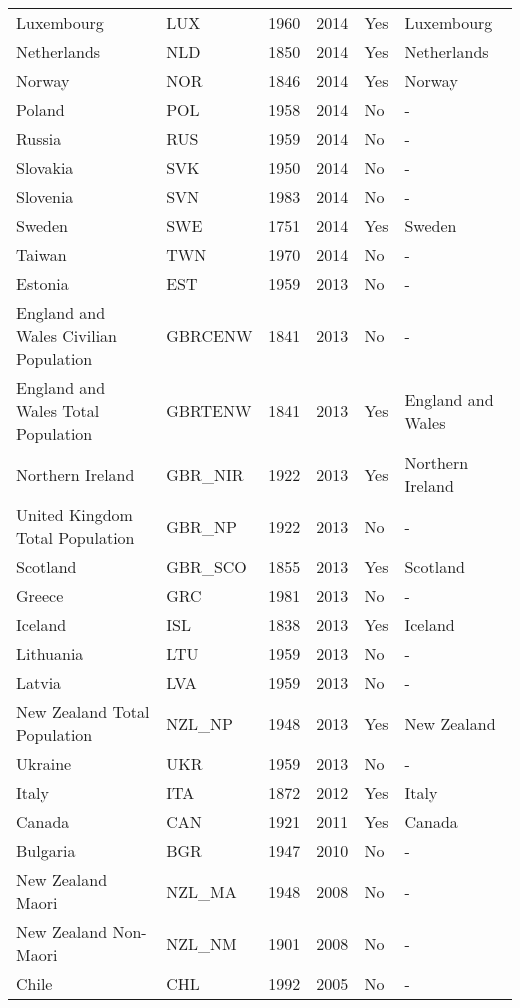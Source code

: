 \documentclass{article}\usepackage[]{graphicx}\usepackage[]{color}
\begin{document}
\begin{table}[ht]
\begin{tabular}{llrrll}
  Luxembourg & LUX & 1960 & 2014 & Yes & Luxembourg \\ 
  Netherlands & NLD & 1850 & 2014 & Yes & Netherlands \\ 
  Norway & NOR & 1846 & 2014 & Yes & Norway \\ 
  Poland & POL & 1958 & 2014 & No & - \\ 
  Russia & RUS & 1959 & 2014 & No & - \\ 
  Slovakia & SVK & 1950 & 2014 & No & - \\ 
  Slovenia & SVN & 1983 & 2014 & No & - \\ 
  Sweden & SWE & 1751 & 2014 & Yes & Sweden \\ 
  Taiwan & TWN & 1970 & 2014 & No & - \\ 
  Estonia & EST & 1959 & 2013 & No & - \\ 
  England and Wales Civilian Population & GBRCENW & 1841 & 2013 & No & - \\ 
  England and Wales Total Population & GBRTENW & 1841 & 2013 & Yes & England and Wales \\ 
  Northern Ireland & GBR\_NIR & 1922 & 2013 & Yes & Northern Ireland \\ 
  United Kingdom Total Population & GBR\_NP & 1922 & 2013 & No & - \\ 
  Scotland & GBR\_SCO & 1855 & 2013 & Yes & Scotland \\ 
  Greece & GRC & 1981 & 2013 & No & - \\ 
  Iceland & ISL & 1838 & 2013 & Yes & Iceland \\ 
  Lithuania & LTU & 1959 & 2013 & No & - \\ 
  Latvia & LVA & 1959 & 2013 & No & - \\ 
  New Zealand Total Population & NZL\_NP & 1948 & 2013 & Yes & New Zealand \\ 
  Ukraine & UKR & 1959 & 2013 & No & - \\ 
  Italy & ITA & 1872 & 2012 & Yes & Italy \\ 
  Canada & CAN & 1921 & 2011 & Yes & Canada \\ 
  Bulgaria & BGR & 1947 & 2010 & No & - \\ 
  New Zealand Maori & NZL\_MA & 1948 & 2008 & No & - \\ 
  New Zealand Non-Maori & NZL\_NM & 1901 & 2008 & No & - \\ 
  Chile & CHL & 1992 & 2005 & No & - \\ 
   \hline
\end{tabular}
\endgroup
\end{table}
\end{document}
